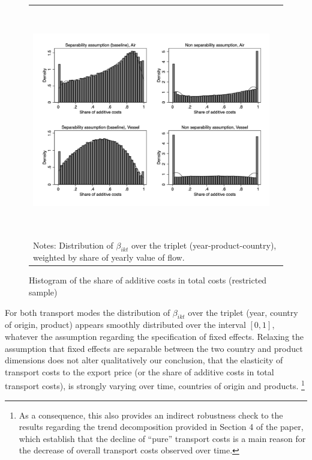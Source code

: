 \documentclass[11pt,twoside, authoryear]{elsarticle}
\begin{document}
\begin{figure}[htbp]
\caption{Histogram of the share of additive costs in total costs (restricted sample)}
\label{fig:histogram_beta_robustness}
\begin{center}
\begin{tabular}{cc}
\includegraphics[width=14cm, height=10cm]{Etude_beta_pond.jpg}\\
\multicolumn{2}{l}{{\footnotesize Notes: Distribution of $\beta_{ikt}$ over the triplet (year-product-country), weighted by share of yearly value of flow.}}\\
\end{tabular}
\end{center}
\end{figure}

For both transport modes the distribution of $\beta_{ikt}$ over the triplet (year, country of origin, product) appears smoothly distributed over the interval $[0,1]$, whatever the assumption regarding the specification of fixed effects.
Relaxing the assumption that fixed effects are separable between the two country and product dimensions does not alter qualitatively our conclusion, that the elasticity of transport costs to the export price (or the share of additive costs in total transport costs), is strongly varying over time, countries of origin and products.
\footnote{As a consequence, this also provides an indirect robustness check to the results regarding the trend decomposition provided in Section 4 of the paper, which establish that the decline of ``pure'' transport costs is a main reason for the decrease of overall transport costs observed over time.}
\end{document}

